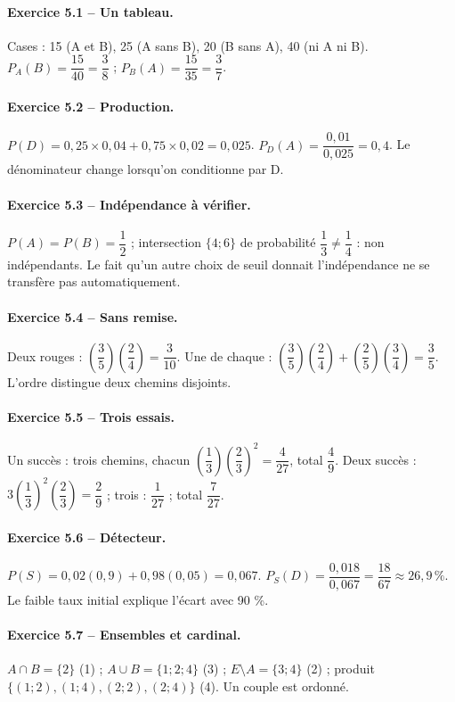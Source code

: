 \paragraph{Exercice 5.1 -- Un tableau.} Cases : 15 (A et B), 25 (A sans B), 20 (B sans A), 40 (ni A ni B). $P_A(B)=\dfrac{15}{40}=\dfrac{3}{8}$ ; $P_B(A)=\dfrac{15}{35}=\dfrac{3}{7}$.
\paragraph{Exercice 5.2 -- Production.} $P(D)=0{,}25\times0{,}04+0{,}75\times0{,}02=0{,}025$. $P_D(A)=\dfrac{0{,}01}{0{,}025}=0{,}4$. Le dénominateur change lorsqu’on conditionne par D.
\paragraph{Exercice 5.3 -- Indépendance à vérifier.} $P(A)=P(B)=\dfrac{1}{2}$ ; intersection $\{4;6\}$ de probabilité $\dfrac{1}{3}\ne \dfrac{1}{4}$ : non indépendants. Le fait qu’un autre choix de seuil donnait l’indépendance ne se transfère pas automatiquement.
\paragraph{Exercice 5.4 -- Sans remise.} Deux rouges : $(\dfrac{3}{5})(\dfrac{2}{4})=\dfrac{3}{10}$. Une de chaque : $(\dfrac{3}{5})(\dfrac{2}{4})+(\dfrac{2}{5})(\dfrac{3}{4})=\dfrac{3}{5}$. L’ordre distingue deux chemins disjoints.
\paragraph{Exercice 5.5 -- Trois essais.} Un succès : trois chemins, chacun $(\dfrac{1}{3})(\dfrac{2}{3})^2=\dfrac{4}{27}$, total $\dfrac{4}{9}$. Deux succès : $3(\dfrac{1}{3})^2(\dfrac{2}{3})=\dfrac{2}{9}$ ; trois : $\dfrac{1}{27}$ ; total $\dfrac{7}{27}$.
\paragraph{Exercice 5.6 -- Détecteur.} $P(S)=0{,}02(0{,}9)+0{,}98(0{,}05)=0{,}067$. $P_S(D)=\dfrac{0{,}018}{0{,}067}=\dfrac{18}{67}\approx 26{,}9\,\%$. Le faible taux initial explique l’écart avec 90 \%.
\paragraph{Exercice 5.7 -- Ensembles et cardinal.} $A\cap B=\{2\}$ (1) ; $A\cup B=\{1;2;4\}$ (3) ; $E\setminus A=\{3;4\}$ (2) ; produit $\{(1;2),(1;4),(2;2),(2;4)\}$ (4). Un couple est ordonné.
